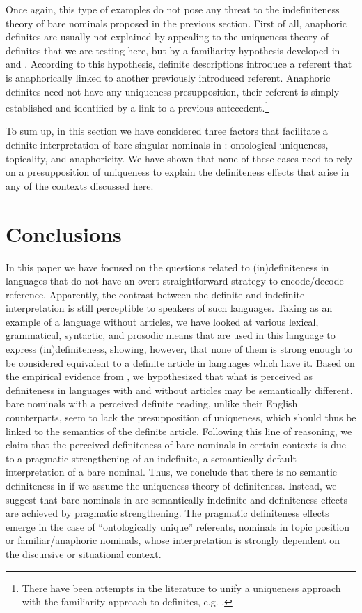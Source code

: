\documentclass[output=paper]{langscibook}
\begin{document}
\noindent Once again, this type of examples do not pose any threat to the indefiniteness theory of bare nominals proposed in the previous section. First of all, anaphoric definites are usually not explained by appealing to the uniqueness theory of definites that we are testing here, but by a familiarity hypothesis developed in \citet{Kamp1981} and \citet{Heim1982}. According to this hypothesis, definite descriptions introduce a referent that is anaphorically linked to another previously introduced referent. Anaphoric definites need not have any uniqueness presupposition, their referent is simply established and identified by a link to a previous antecedent.\footnote{There have been attempts in the literature to unify a uniqueness approach with the familiarity approach to definites, e.g. \citet{farkas03}.}

To sum up, in this section we have considered three factors that facilitate a definite interpretation of bare singular nominals in : ontological uniqueness, topicality, and anaphoricity. We have shown that none of these cases need to rely on a presupposition of uniqueness to explain the definiteness effects that arise in any of the contexts discussed here.

\section{Conclusions}
In this paper we have focused on the questions related to (in)definiteness in languages that do not have an overt straightforward strategy to encode/decode reference. Apparently, the contrast between the definite and indefinite interpretation is still perceptible to speakers of such languages. Taking  as an example of a language without articles, we have looked at various lexical, grammatical, syntactic, and prosodic means that are used in this language to express (in)definiteness, showing, however, that none of them is strong enough to be considered equivalent to a definite article in languages which have it. Based on the empirical evidence from , we hypothesized that what is perceived as definiteness in languages with and without articles may be semantically different.  bare nominals with a perceived definite reading, unlike their English counterparts, seem to lack the presupposition of uniqueness, which should thus be linked to the semantics of
the definite article. Following this line of reasoning, we claim that the perceived definiteness of  bare nominals in certain contexts is due to a pragmatic strengthening of an indefinite, a semantically default interpretation of a bare nominal. Thus, we conclude that there is no semantic definiteness in  if we assume the uniqueness theory of definiteness. Instead, we suggest that bare nominals in  are semantically indefinite and definiteness effects are achieved by pragmatic strengthening. The pragmatic definiteness effects emerge in the case of ``ontologically unique'' referents, nominals in topic position or familiar/anaphoric nominals, whose interpretation is strongly dependent on the discursive or situational context.
\end{document}
